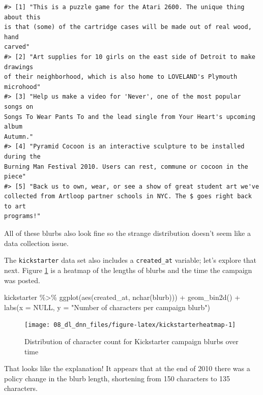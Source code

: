 \documentclass[
]{krantz}
\makeatletter
\newenvironment{Shaded}{\begin{snugshade}}{\end{snugshade}}
\newcommand{\AttributeTok}[1]{\textcolor[rgb]{0.77,0.63,0.00}{#1}}
\newcommand{\ConstantTok}[1]{\textcolor[rgb]{0.00,0.00,0.00}{#1}}
\newcommand{\FunctionTok}[1]{\textcolor[rgb]{0.00,0.00,0.00}{#1}}
\newcommand{\NormalTok}[1]{#1}
\newcommand{\SpecialCharTok}[1]{\textcolor[rgb]{0.00,0.00,0.00}{#1}}
\newcommand{\StringTok}[1]{\textcolor[rgb]{0.31,0.60,0.02}{#1}}
\newenvironment{kframe}{%
\medskip{}
\setlength{\fboxsep}{.8em}
 \def\at@end@of@kframe{}%
 \ifinner\ifhmode%
  \def\at@end@of@kframe{\end{minipage}}%
  \begin{minipage}{\columnwidth}%
 \fi\fi%
 \def\FrameCommand##1{\hskip\@totalleftmargin \hskip-\fboxsep
 \colorbox{shadecolor}{##1}\hskip-\fboxsep
     \hskip-\linewidth \hskip-\@totalleftmargin \hskip\columnwidth}%
 \MakeFramed {\advance\hsize-\width
   \@totalleftmargin\z@ \linewidth\hsize
   \@setminipage}}%
 {\par\unskip\endMakeFramed%
 \at@end@of@kframe}
\renewenvironment{Shaded}{\begin{kframe}}{\end{kframe}}
\makeatother
\begin{document}
\begin{verbatim}
#> [1] "This is a puzzle game for the Atari 2600. The unique thing about this
is that (some) of the cartridge cases will be made out of real wood, hand
carved"
#> [2] "Art supplies for 10 girls on the east side of Detroit to make drawings
of their neighborhood, which is also home to LOVELAND's Plymouth microhood"
#> [3] "Help us make a video for 'Never', one of the most popular songs on
Songs To Wear Pants To and the lead single from Your Heart's upcoming album
Autumn."
#> [4] "Pyramid Cocoon is an interactive sculpture to be installed during the
Burning Man Festival 2010. Users can rest, commune or cocoon in the piece"
#> [5] "Back us to own, wear, or see a show of great student art we've
collected from Artloop partner schools in NYC. The $ goes right back to art
programs!"
\end{verbatim}

All of these blurbs also look fine so the strange distribution doesn't seem like a data collection issue.

The \texttt{kickstarter} data set also includes a \texttt{created\_at} variable; let's explore that next. Figure \ref{fig:kickstarterheatmap} is a heatmap of the lengths of blurbs and the time the campaign was posted.

\begin{Shaded}
\begin{Highlighting}[]
\NormalTok{kickstarter }\SpecialCharTok{\%\textgreater{}\%}
  \FunctionTok{ggplot}\NormalTok{(}\FunctionTok{aes}\NormalTok{(created\_at, }\FunctionTok{nchar}\NormalTok{(blurb))) }\SpecialCharTok{+}
  \FunctionTok{geom\_bin2d}\NormalTok{() }\SpecialCharTok{+}
  \FunctionTok{labs}\NormalTok{(}\AttributeTok{x =} \ConstantTok{NULL}\NormalTok{,}
       \AttributeTok{y =} \StringTok{"Number of characters per campaign blurb"}\NormalTok{)}
\end{Highlighting}
\end{Shaded}

\begin{figure}

{\centering \texttt{[image: 08\_dl\_dnn\_files/figure-latex/kickstarterheatmap-1]} 

}

\caption{Distribution of character count for Kickstarter campaign blurbs over time}\label{fig:kickstarterheatmap}
\end{figure}

That looks like the explanation! It appears that at the end of 2010 there was a policy change in the blurb length, shortening from 150 characters to 135 characters.
\end{document}
